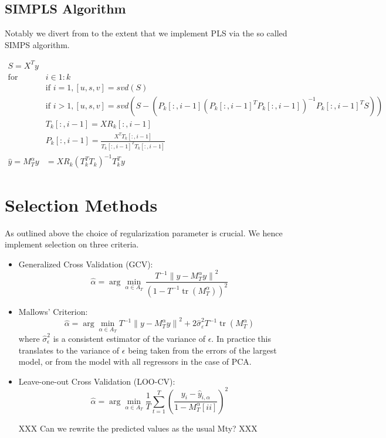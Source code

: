 \subsection{SIMPLS Algorithm}

Notably we divert from \citeauthor{carrasco2016sample} to the extent that we implement PLS via the so called SIMPS algorithm. 

\begin{align}
\nonumber S = X^{T} y & \\
\nonumber \text{for } & i \in 1:k \\
\nonumber &\text{if } i = 1, [u, s, v] = svd(S) \\
\nonumber &\text{if } i > 1, [u, s, v] = svd(S - (P_{k}[:, i-1](P_{k}[:, i-1]^{T} P_{k}[:, i-1])^{-1} P_{k}[:, i-1]^{T} S)) \\
\nonumber &T_{k}[:, i - 1] = X R_{k}[:, i - 1] \\
\nonumber &P_{k}[:, i - 1] = \frac{X^{T} T_{k}[:, i - 1]}{T_{k}[:, i - 1]^{T}T_{k}[:, i - 1]} \\
\nonumber \widehat{y} = M^{\alpha}_{T} y &= X R_{k} (T^{T}_{k} T_{k})^{-1} T^{T}_{k} y
\end{align}

\section{Selection Methods} \label{sec::cv}

As outlined above the choice of regularization parameter is crucial. We hence implement selection on three criteria.

\begin{itemize}
	\item Generalized Cross Validation (GCV): \\
\[\hat{\alpha}=\arg \min _{\alpha \in A_{T}} \frac{T^{-1}\left\|y-M_{T}^{\alpha} y\right\|^{2}}{\left(1-T^{-1} \operatorname{tr}\left(M_{T}^{\alpha}\right)\right)^{2}}\]

	\item Mallows' Criterion: \\
\[\hat{\alpha}=\arg \min _{\alpha \in A_{T}} T^{-1}\left\|y-M_{T}^{\alpha} y\right\|^{2}+2 \widehat{\sigma}_{\varepsilon}^{2} T^{-1} \operatorname{tr}\left(M_{T}^{\alpha}\right)\]
where $\widehat{\sigma}_{\epsilon}^{2}$ is a consistent estimator of the variance of $\epsilon$. In practice this translates to the variance of $\epsilon$ being taken from the errors of the largest model, or from the model with all regressors in the case of PCA.

	\item Leave-one-out Cross Validation (LOO-CV): \\
\[\hat{\alpha}=\arg \min _{\alpha \in A_{T}} \frac{1}{T} \sum_{t=1}^{T}\left(\frac{y_{i}-\hat{y}_{i, \alpha}}{1-M_{T}^{\alpha}[ii]}\right)^{2}\]

XXX Can we rewrite the predicted values as the usual Mty? XXX
\end{itemize}

